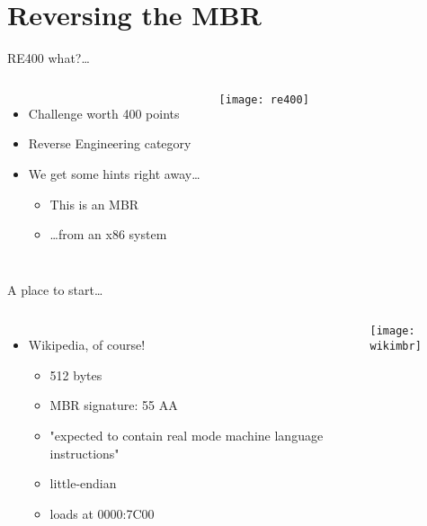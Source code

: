 
\section{Reversing the MBR}

\begin{frame}{RE400 what?\ldots}
    \begin{columns}
	        \begin{itemize}
                \item Challenge worth 400 points
                \item Reverse Engineering category
                \item We get some hints right away\ldots
                \begin{itemize}
                	\item This is an MBR
                	\item \ldots from an x86 system
        	    \end{itemize}
            \end{itemize}
                {\texttt{[image: re400]}}
    \end{columns}
\end{frame}

\begin{frame}{A place to start\ldots}
    \begin{columns}
	        \begin{itemize}
                \item<1-> Wikipedia, of course!
		        \begin{itemize}
    	            \item<2-> 512 bytes
        	        \item<2-> MBR signature: 55 AA
            	    \item<2-> "expected to contain real mode machine language instructions"
                	\item<2-> little-endian
                	\item<2-> loads at 0000:7C00
	            \end{itemize}                	
            \end{itemize}
                {\texttt{[image: wikimbr]}}
    \end{columns}
\end{frame}

